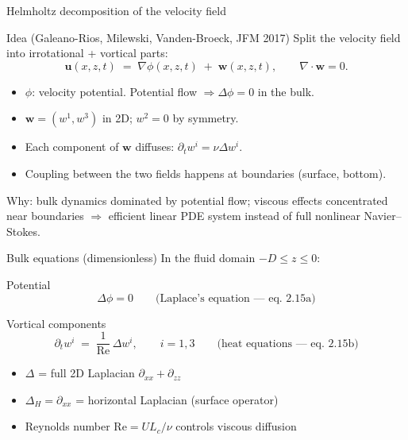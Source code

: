 \documentclass[aspectratio=169, 10pt]{beamer}
\newcommand{\Rey}{\mathrm{Re}}
\newcommand{\uu}{\mathbf{u}}
\newcommand{\ww}{\mathbf{w}}
\begin{document}
\begin{frame}{Helmholtz decomposition of the velocity field}
\begin{block}{Idea (Galeano-Rios, Milewski, Vanden-Broeck, JFM 2017)}
Split the velocity field into irrotational + vortical parts:
\[
\uu(x,z,t) \;=\; \nabla\phi(x,z,t) \;+\; \ww(x,z,t), \qquad
\nabla \cdot \ww = 0.
\]
\end{block}

\begin{itemize}
    \item $\phi$: velocity potential. Potential flow $\Rightarrow \Delta \phi = 0$ in the bulk.
    \item $\ww = (w^1, w^3)$ in 2D; $w^2 = 0$ by symmetry.
    \item Each component of $\ww$ diffuses: $\partial_t w^i = \nu \Delta w^i$.
    \item Coupling between the two fields happens at boundaries (surface, bottom).
\end{itemize}

\vspace{0.5em}
\small Why: bulk dynamics dominated by potential flow; viscous effects concentrated near boundaries $\Rightarrow$ efficient linear PDE system instead of full nonlinear Navier--Stokes.
\end{frame}

\begin{frame}{Bulk equations (dimensionless)}
In the fluid domain $-D \le z \le 0$:
\begin{block}{Potential}
\[
\Delta \phi = 0 \qquad \text{(Laplace's equation — eq.~2.15a)}
\]
\end{block}

\begin{block}{Vortical components}
\[
\partial_t w^i \;=\; \frac{1}{\Rey}\,\Delta w^i, \qquad i = 1, 3  \qquad \text{(heat equations — eq.~2.15b)}
\]
\end{block}

\begin{itemize}
    \item $\Delta$ = full 2D Laplacian $\partial_{xx} + \partial_{zz}$
    \item $\Delta_H = \partial_{xx}$ = horizontal Laplacian (surface operator)
    \item Reynolds number $\Rey = U L_c / \nu$ controls viscous diffusion
\end{itemize}
\end{frame}
\end{document}
